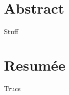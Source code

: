 \section*{Abstract}

\begin{outline}
\1 Stuff
\end{outline}


\newpage
\section*{Resumée}


\begin{outline}
\1 Trucs
\end{outline}
